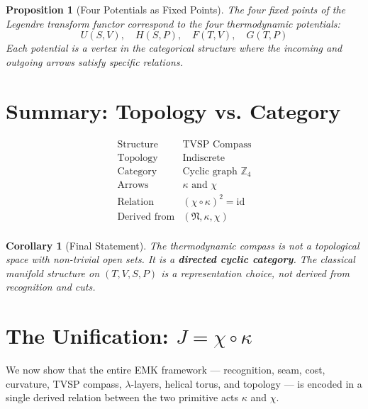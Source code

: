 \documentclass[12pt]{article}
\newtheorem{corollary}[axiom]{Corollary}
\newtheorem{proposition}[axiom]{Proposition}
\begin{document}
\begin{proposition}[Four Potentials as Fixed Points]
The four fixed points of the Legendre transform functor correspond to the four thermodynamic potentials:
\[
U(S,V),\quad H(S,P),\quad F(T,V),\quad G(T,P)
\]
Each potential is a vertex in the categorical structure where the incoming and outgoing arrows satisfy specific relations.
\end{proposition}

\section{Summary: Topology vs. Category}

\[
\boxed{
\begin{array}{c|c}
\text{Structure} & \text{TVSP Compass} \\
\hline
\text{Topology} & \text{Indiscrete} \\
\text{Category} & \text{Cyclic graph } \mathbb{Z}_4 \\
\text{Arrows} & \kappa \text{ and } \chi \\
\text{Relation} & (\chi \circ \kappa)^2 = \text{id} \\
\text{Derived from} & (\mathfrak N, \kappa, \chi) \\
\end{array}
}
\]

\begin{corollary}[Final Statement]
The thermodynamic compass is not a topological space with non-trivial open sets. It is a \textbf{directed cyclic category}. The classical manifold structure on \((T, V, S, P)\) is a representation choice, not derived from recognition and cuts.
\end{corollary}

\section{The Unification: \(J = \chi \circ \kappa\)}

We now show that the entire EMK framework — recognition, seam, cost, curvature, TVSP compass, \(\lambda\)-layers, helical torus, and topology — is encoded in a single derived relation between the two primitive acts \(\kappa\) and \(\chi\).
\end{document}
